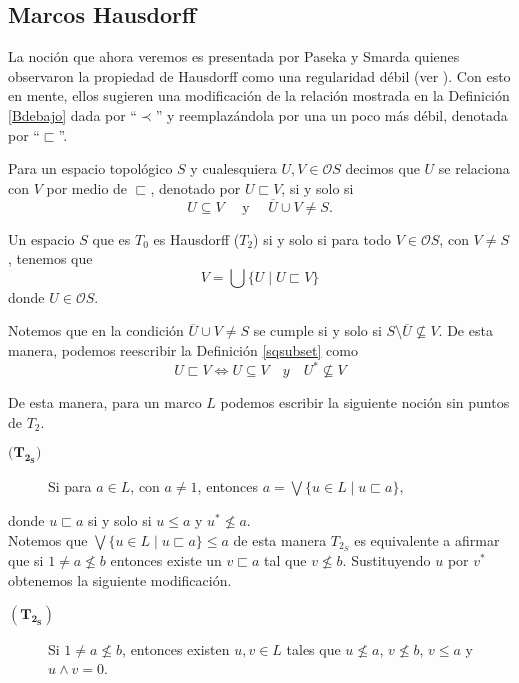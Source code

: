 \documentclass{comunicaciones}
\begin{document}
\subsection{Marcos Hausdorff}

La noción que ahora veremos es presentada por Paseka y Smarda quienes observaron la propiedad de Hausdorff como una regularidad débil (ver \cite{P.S.}). Con esto en mente, ellos sugieren una modificación de la relación mostrada en la Definición \ref{Bdebajo} dada por ``$\prec$'' y reemplazándola por una un poco más débil, denotada por ``$\sqsubset$''. 

\begin{dfn}\label{sqsubset}
    Para un espacio topológico $S$ y cualesquiera $U, V\in \mathcal{O}S$ decimos que $U$ se relaciona con $V$ por medio de $\sqsubset$, denotado por $U\sqsubset V$, si y solo si 
    \[
    U\subseteq V\quad\mbox{ y }\quad \overline{U}\cup V\neq S.
    \]
\end{dfn}

\begin{prop}\label{Proposicion3.2}
    Un espacio $S$ que es $T_0$ es Hausdorff ($T_2$) si y solo si para todo $V\in \mathcal{O}S$, con $V\neq S$, tenemos que 
    \[
    V=\bigcup\{U\mid U\sqsubset V\}
    \]
    donde $U\in \mathcal{O}S$.
\end{prop}

Notemos que en la condición $\overline{U}\cup V\neq S$ se cumple si y solo si $S\setminus \overline{U}\nsubseteq V$. De esta manera, podemos reescribir la Definición \ref{sqsubset} como 
\[
U\sqsubset V\Leftrightarrow U\subseteq V\quad{ y }\quad U^*\nsubseteq V
\]

De esta manera, para un marco $L$ podemos escribir la siguiente noción sin puntos de $T_2$.
\begin{description}
    \item[$\mathbf{(T_{2_S}})$] Si para $a\in L$, con $a\neq 1$, entonces $a=\bigvee\{u\in L\mid u\sqsubset a\}$, 
\end{description}
donde $u\sqsubset a$ si y solo si $u\leq a$ y $u^*\nleq a$.\\

Notemos que $\bigvee\{u\in L\mid u\sqsubset a\}\leq a$ de esta manera $T_{2_S}$ es equivalente a afirmar que si $1\neq a\nleq b$ entonces existe un $v\sqsubset a$ tal que $v\nleq b$. Sustituyendo $u$ por $v^*$ obtenemos la siguiente modificación.

\begin{description}
    \item[$\mathbf{(T_{2_S})}$] Si $1\neq a\nleq b$, entonces existen $u, v\in L$ tales que $u\nleq a$, $v\nleq b$, $v\leq a$ y $u\wedge v=0$. 
\end{description}
\end{document}
